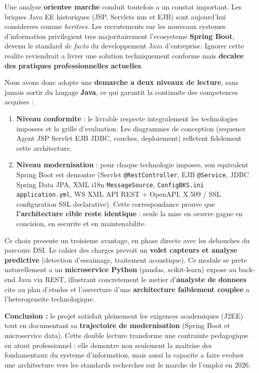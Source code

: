 Une analyse \textbf{orientee marche} conduit toutefois a un constat important.
Les briques Java EE historiques (JSP, Servlets \og nus \fg{} et EJB) sont
aujourd'hui considerees comme \emph{heritees}. Les recrutements sur les nouveaux
systemes d'information privilegient tres majoritairement l'ecosysteme
\textbf{Spring Boot}, devenu le standard \emph{de facto} du developpement Java
d'entreprise. Ignorer cette realite reviendrait a livrer une solution
techniquement conforme mais \textbf{decalee des pratiques professionnelles
actuelles}.

Nous avons donc adopte une \textbf{demarche a deux niveaux de lecture}, sans
jamais sortir du langage \textbf{Java}, ce qui garantit la continuite des
competences acquises :
\begin{enumerate}
  \item \textbf{Niveau conformite} : le livrable respecte integralement les
        technologies imposees et la grille d'evaluation. Les diagrammes de
        conception (sequence Agent \textrightarrow{} JSP \textrightarrow{}
        Servlet \textrightarrow{} EJB \textrightarrow{} JDBC, couches,
        deploiement) refletent fidelement cette architecture.
  \item \textbf{Niveau modernisation} : pour chaque technologie imposee, son
        equivalent Spring Boot est demontre (Servlet \textrightarrow{}
        \texttt{@RestController}, EJB \textrightarrow{} \texttt{@Service}, JDBC
        \textrightarrow{} Spring Data JPA, XML i18n \textrightarrow{}
        \texttt{MessageSource}, \texttt{ConfigBKS.ini} \textrightarrow{}
        \texttt{application.yml}, WS XML \textrightarrow{} API REST + OpenAPI,
        X.509 / SSL \textrightarrow{} configuration SSL declarative). Cette
        correspondance prouve que \textbf{l'architecture cible reste identique} :
        seule la mise en oeuvre gagne en concision, en securite et en
        maintenabilite.
\end{enumerate}

Ce choix presente un troisieme avantage, en phase directe avec les debouches du
parcours DSI. Le cahier des charges prevoit un \textbf{volet capteurs et analyse
predictive} (detection d'essaimage, traitement acoustique). Ce module se prete
naturellement a un \textbf{microservice Python} (pandas, scikit-learn) expose au
back-end Java via REST, illustrant concretement le metier d'\textbf{analyste de
donnees} cite au plan d'etudes et l'ouverture d'une \textbf{architecture
faiblement couplee} a l'heterogeneite technologique.

\begin{encadre}
\textbf{Conclusion :} le projet satisfait pleinement les exigences academiques
(J2EE) tout en documentant sa \textbf{trajectoire de modernisation} (Spring Boot
et microservice data). Cette double lecture transforme une contrainte
pedagogique en atout professionnel : elle demontre non seulement la maitrise des
fondamentaux du systeme d'information, mais aussi la capacite a faire evoluer une
architecture vers les standards recherches sur le marche de l'emploi en 2026.
\end{encadre}